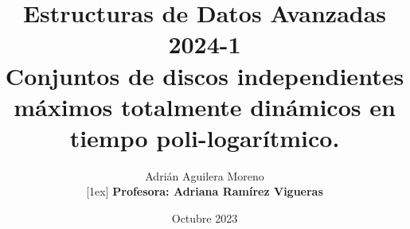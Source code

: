 \title[Title Short]{Estructuras de Datos Avanzadas 2024-1\\
                   \textbf{Conjuntos de discos independientes máximos totalmente dinámicos en tiempo poli-logarítmico.}}
\author[Name]{Adrián Aguilera Moreno \texorpdfstring{\\}{and}[1ex]
                     {\small{ \textbf{Profesora: Adriana Ramírez Vigueras}}}}
\date[]{Octubre 2023}
